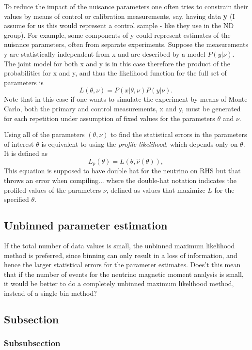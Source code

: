 To reduce the impact of the nuisance parameters one often tries to constrain their values by means of control or calibration measurements, say, having data \textbf{y} (I assume for us this would represent a control sample - like they use in the ND group). For example, some components of y could represent estimates of the nuisance parameters, often from separate experiments. Suppose the measurements y are statistically independent from x and are described by a model $P\left(y|\nu\right)$. The joint model for both x and y is in this case therefore the product of the probabilities for x
and y, and thus the likelihood function for the full set of parameters is
\begin{equation}
L\left(\theta,\nu\right)=P\left(x|\theta,\nu\right)P\left(y|\nu\right).
\end{equation}
Note that in this case if one wants to simulate the experiment by means of Monte Carlo, both the primary and control measurements, x and y, must be generated for each repetition under assumption of fixed values for the parameters $\theta$ and $\nu$.

Using all of the parameters $\left(\theta,\nu\right)$  to find the statistical errors in the parameters of interest $\theta$ is equivalent to using the \textit{profile likelihood}, which depends only on $\theta$. It is defined as
\begin{equation}
L_p\left(\theta\right)=L\left(\theta,\hat{\nu}\left(\theta\right)\right),
\end{equation}
This equation is supposed to have double hat for the neutrino on RHS but that throws an error when compiling...
where the double-hat notation indicates the profiled values of the parameters $\nu$, defined as values that maximize $L$ for the specified $\theta$.

\subsection{Unbinned parameter estimation}
If the total number of data values is small, the unbinned maximum likelihood method is preferred, since binning can only result in a loss of information, and hence the larger statistical errors for the parameter estimates.
Does't this mean that if the number of events for the neutrino magnetic moment analysis is small, it would be better to do a completely unbinned maximum likelihood method, instead of a single bin method?


\subsection{Subsection}

\subsubsection{Subsubsection}
